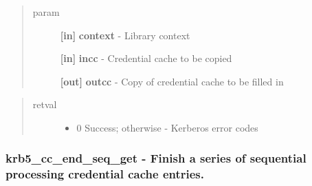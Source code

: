 \documentclass[letterpaper,10pt,english]{sphinxmanual}
\begin{document}
\begin{fulllineitems}
\label{appdev/refs/api/krb5_cc_copy_creds:c.krb5_cc_copy_creds}
\end{fulllineitems}

\begin{quote}\begin{description}
\item[{param}] \leavevmode
\textbf{{[}in{]}} \textbf{context} - Library context

\textbf{{[}in{]}} \textbf{incc} - Credential cache to be copied

\textbf{{[}out{]}} \textbf{outcc} - Copy of credential cache to be filled in

\end{description}\end{quote}
\begin{quote}\begin{description}
\item[{retval}] \leavevmode\begin{itemize}
\item {} 
0   Success; otherwise - Kerberos error codes

\end{itemize}

\end{description}\end{quote}


\subsubsection{krb5\_cc\_end\_seq\_get -  Finish a series of sequential processing credential cache entries.}
\label{appdev/refs/api/krb5_cc_end_seq_get:krb5-cc-end-seq-get-finish-a-series-of-sequential-processing-credential-cache-entries}\label{appdev/refs/api/krb5_cc_end_seq_get::doc}

\begin{fulllineitems}
\label{appdev/refs/api/krb5_cc_end_seq_get:c.krb5_cc_end_seq_get}
\end{fulllineitems}
\end{document}
